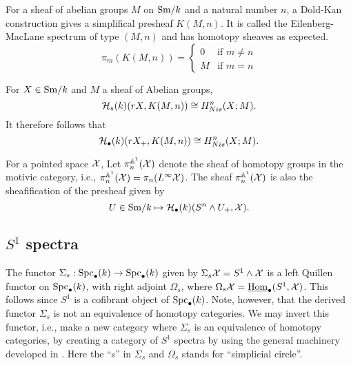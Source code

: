 \documentclass{amsart}%
\begin{document}
For a sheaf of abelian groups $M$ on $\mathrm{Sm}/k$ and a natural number $n$,
a Dold-Kan construction gives a simplifical presheaf $K(M,n)$. It is
called the Eilenberg-MacLane spectrum of type $(M,n)$ and has homotopy
sheaves as expected.
\begin{equation*}
  \pi_m(K(M,n)) = \begin{cases}0 & \text{if }m\neq n \\ M & \text{if } m = n \end{cases}
\end{equation*}

\begin{proposition}
  For $X\in\mathrm{Sm}/k$ and $M$ a sheaf of Abelian groups,
\begin{equation*}
  \mathcal{H}_s(k)(rX, K(M,n)) \cong H^n_{Nis}(X; M).
\end{equation*}
It therefore follows that
\begin{equation*}
  \mathcal{H}_{\bullet}(k)(rX_+, K(M,n)) \cong H^n_{Nis}(X; M).
\end{equation*}
\end{proposition}

\begin{notation}

  For a pointed space $\mathcal{X}$, Let $\pi_n^{\mathbb{A}^1}(\mathcal{X})$ denote the
  sheaf of homotopy groups in the motivic category, i.e.,
  $\pi^{\mathbb{A}^1}_n(\mathcal{X}) = \pi_n(L^{\infty}\mathcal{X})$.  The sheaf
  $\pi^{\mathbb{A}^1}_n(\mathcal{X})$ is also the sheafification of the presheaf
  given by
  \begin{equation*}
    U \in \mathrm{Sm}/k \mapsto \mathcal{H}_{\bullet}(k)(S^n\wedge U_+, \mathcal{X}).
  \end{equation*}
\end{notation}

\subsection{$S^1$ spectra}

The functor $\Sigma_s : \mathrm{Spc}_{\bullet}(k) \to \mathrm{Spc}_{\bullet}(k)$ given
by $\Sigma_s \mathcal{X} = S^1 \wedge \mathcal{X}$ is a left Quillen functor on
$\mathrm{Spc}_{\bullet}(k)$, with right adjoint $\Omega_s$, where
$\Omega_s\mathcal{X} = \underline{\operatorname{Hom}}_{\bullet}(S^1,\mathcal{X})$. This follows
since $S^1$ is a cofibrant object of $\mathrm{Spc}_{\bullet}(k)$. Note,
however, that the derived functor $\Sigma_s$ is not an equivalence of
homotopy categories. We may invert this functor, i.e., make a new
category where $\Sigma_s$ is an equivalence of homotopy categories, by
creating a category of $S^1$ spectra by using the general machinery
developed in \cite{H-Spt}. Here the ``s'' in $\Sigma_s$ and $\Omega_s$
stands for ``simplicial circle''.
\end{document}
